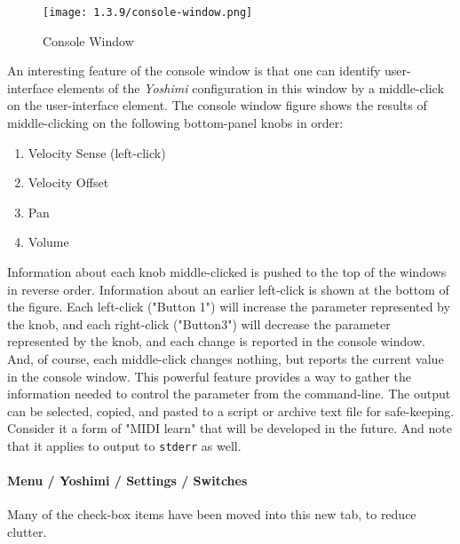 \begin{figure}[H]
   \centering 
   \texttt{[image: 1.3.9/console-window.png]}
   \caption[Yoshimi Console Window]{Console Window}
   \label{fig:console_window}
\end{figure}

   An interesting feature of the console window is that one can identify
   user-interface elements of the \textsl{Yoshimi} configuration in this window
   by a middle-click on the user-interface element.  The console window figure
   shows the results of middle-clicking on the following bottom-panel knobs in
   order:

   \begin{enumerate}
      \item Velocity Sense (left-click)
      \item Velocity Offset
      \item Pan
      \item Volume
   \end{enumerate}

   Information about each knob middle-clicked is pushed to the top of the
   windows in reverse order.
   Information about an earlier left-click is shown at the bottom of the figure.
   Each left-click ("Button 1") will increase the parameter represented by the
   knob, and each right-click ("Button3") will decrease the parameter
   represented by the knob, and each change is reported in the console window.
   And, of course, each middle-click changes nothing, but reports the current
   value in the console window.
   This powerful feature provides a way to gather the information needed to
   control the parameter from the command-line.
   The output can be selected, copied, and pasted to a script or archive text
   file for safe-keeping.
   Consider it a form of "MIDI learn" that will be developed in the future.
   And note that it applies to output to \texttt{stderr} as well.

\paragraph{Menu / Yoshimi / Settings / Switches}
\label{paragraph:menu_yoshimi_settings_switches}

   Many of the check-box items have been moved into this new tab, to reduce
   clutter.

